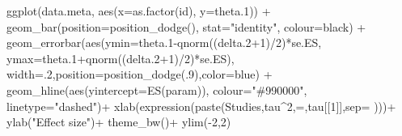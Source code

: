 \documentclass[
]{book}
\newenvironment{Shaded}{\begin{snugshade}}{\end{snugshade}}
\newcommand{\AttributeTok}[1]{\textcolor[rgb]{0.77,0.63,0.00}{#1}}
\newcommand{\DecValTok}[1]{\textcolor[rgb]{0.00,0.00,0.81}{#1}}
\newcommand{\FloatTok}[1]{\textcolor[rgb]{0.00,0.00,0.81}{#1}}
\newcommand{\FunctionTok}[1]{\textcolor[rgb]{0.00,0.00,0.00}{#1}}
\newcommand{\NormalTok}[1]{#1}
\newcommand{\SpecialCharTok}[1]{\textcolor[rgb]{0.00,0.00,0.00}{#1}}
\newcommand{\StringTok}[1]{\textcolor[rgb]{0.31,0.60,0.02}{#1}}
\theoremstyle{definition}
\theoremstyle{definition}
\theoremstyle{definition}
\theoremstyle{definition}
\theoremstyle{remark}
\begin{document}
\begin{Shaded}
\begin{Highlighting}[]
  \FunctionTok{ggplot}\NormalTok{(data.meta, }\FunctionTok{aes}\NormalTok{(}\AttributeTok{x=}\FunctionTok{as.factor}\NormalTok{(id), }\AttributeTok{y=}\NormalTok{theta}\FloatTok{.1}\NormalTok{)) }\SpecialCharTok{+}
      \FunctionTok{geom\_bar}\NormalTok{(}\AttributeTok{position=}\FunctionTok{position\_dodge}\NormalTok{(), }\AttributeTok{stat=}\StringTok{"identity"}\NormalTok{, }\AttributeTok{colour=}\StringTok{\textquotesingle{}black\textquotesingle{}}\NormalTok{) }\SpecialCharTok{+}
      \FunctionTok{geom\_errorbar}\NormalTok{(}\FunctionTok{aes}\NormalTok{(}\AttributeTok{ymin=}\NormalTok{theta}\FloatTok{.1}\SpecialCharTok{{-}}\FunctionTok{qnorm}\NormalTok{((delta}\FloatTok{.2}\SpecialCharTok{+}\DecValTok{1}\NormalTok{)}\SpecialCharTok{/}\DecValTok{2}\NormalTok{)}\SpecialCharTok{*}\NormalTok{se.ES, }\AttributeTok{ymax=}\NormalTok{theta}\FloatTok{.1}\SpecialCharTok{+}\FunctionTok{qnorm}\NormalTok{((delta}\FloatTok{.2}\SpecialCharTok{+}\DecValTok{1}\NormalTok{)}\SpecialCharTok{/}\DecValTok{2}\NormalTok{)}\SpecialCharTok{*}\NormalTok{se.ES), }\AttributeTok{width=}\NormalTok{.}\DecValTok{2}\NormalTok{,}\AttributeTok{position=}\FunctionTok{position\_dodge}\NormalTok{(.}\DecValTok{9}\NormalTok{),}\AttributeTok{color=}\StringTok{\textquotesingle{}blue\textquotesingle{}}\NormalTok{) }\SpecialCharTok{+}
      \FunctionTok{geom\_hline}\NormalTok{(}\FunctionTok{aes}\NormalTok{(}\AttributeTok{yintercept=}\FunctionTok{ES}\NormalTok{(param)), }\AttributeTok{colour=}\StringTok{"\#990000"}\NormalTok{, }\AttributeTok{linetype=}\StringTok{"dashed"}\NormalTok{)}\SpecialCharTok{+}
      \FunctionTok{xlab}\NormalTok{(}\FunctionTok{expression}\NormalTok{(}\FunctionTok{paste}\NormalTok{(}\StringTok{\textquotesingle{}Studies\textquotesingle{}}\NormalTok{,tau}\SpecialCharTok{\^{}}\DecValTok{2}\NormalTok{,}\StringTok{\textquotesingle{}=\textquotesingle{}}\NormalTok{,tau[[}\DecValTok{1}\NormalTok{]],}\AttributeTok{sep=}\StringTok{\textquotesingle{} \textquotesingle{}}\NormalTok{)))}\SpecialCharTok{+}
      \FunctionTok{ylab}\NormalTok{(}\StringTok{"Effect size"}\NormalTok{)}\SpecialCharTok{+}
      \FunctionTok{theme\_bw}\NormalTok{()}\SpecialCharTok{+}
      \FunctionTok{ylim}\NormalTok{(}\SpecialCharTok{{-}}\DecValTok{2}\NormalTok{,}\DecValTok{2}\NormalTok{)}


\end{Highlighting}
\end{Shaded}
\end{document}

